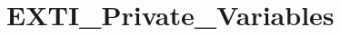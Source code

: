 \hypertarget{group___e_x_t_i___private___variables}{}\section{E\+X\+T\+I\+\_\+\+Private\+\_\+\+Variables}
\label{group___e_x_t_i___private___variables}

